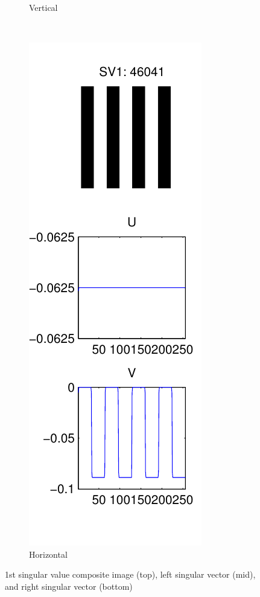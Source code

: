 \documentclass{report}
\begin{document}
\begin{figure}[H]
\begin{subfigure}[b]{0.2\textwidth}
                \caption{Vertical}
        \end{subfigure}
        ~~~
        \begin{subfigure}[b]{0.19\textwidth}
        		\includegraphics[width=\textwidth]{graphics/singular_vectors_vertical.pdf}
        		\caption{Horizontal}
        \end{subfigure}
        \caption{1st singular value composite image (top), left singular vector (mid), and right singular vector (bottom) }
        \label{fig:rank1_vectors}
\end{figure}
\end{document}

